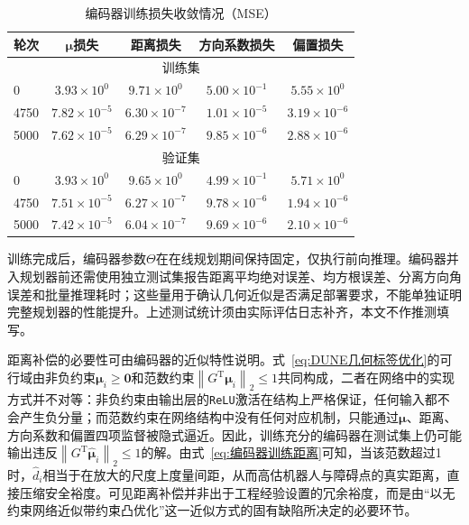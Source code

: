 \begin{table}[!htb]
	\centering
	\small
	\caption{编码器训练损失收敛情况（MSE）}
	\label{tab:距离编码器训练损失}
	\begin{tabular}{lcccc}
		\toprule
		轮次 & $\boldsymbol\mu$损失 & 距离损失 & 方向系数损失 & 偏置损失 \\
		\midrule
		\multicolumn{5}{c}{训练集} \\
		\midrule
		0 & $3.93\times10^{0}$ & $9.71\times10^{0}$ & $5.00\times10^{-1}$ & $5.55\times10^{0}$ \\
		4750 & $7.82\times10^{-5}$ & $6.30\times10^{-7}$ & $1.01\times10^{-5}$ & $3.19\times10^{-6}$ \\
		5000 & $7.62\times10^{-5}$ & $6.29\times10^{-7}$ & $9.85\times10^{-6}$ & $2.88\times10^{-6}$ \\
		\midrule
		\multicolumn{5}{c}{验证集} \\
		\midrule
		0 & $3.93\times10^{0}$ & $9.65\times10^{0}$ & $4.99\times10^{-1}$ & $5.71\times10^{0}$ \\
		4750 & $7.51\times10^{-5}$ & $6.27\times10^{-7}$ & $9.78\times10^{-6}$ & $1.94\times10^{-6}$ \\
		5000 & $7.42\times10^{-5}$ & $6.04\times10^{-7}$ & $9.69\times10^{-6}$ & $2.10\times10^{-6}$ \\
		\bottomrule
	\end{tabular}
\end{table}

训练完成后，编码器参数$\Theta$在在线规划期间保持固定，仅执行前向推理。编码器并入规划器前还需使用独立测试集报告距离平均绝对误差、均方根误差、分离方向角误差和批量推理耗时；这些量用于确认几何近似是否满足部署要求，不能单独证明完整规划器的性能提升。上述测试统计须由实际评估日志补齐，本文不作推测填写。

距离补偿的必要性可由编码器的近似特性说明。式~\eqref{eq:DUNE几何标签优化}的可行域由非负约束$\boldsymbol\mu_i\geq\mathbf0$和范数约束$\left\|G^{\mathrm T}\boldsymbol\mu_i\right\|_2\leq1$共同构成，二者在网络中的实现方式并不对等：非负约束由输出层的\texttt{ReLU}激活在结构上严格保证，任何输入都不会产生负分量；而范数约束在网络结构中没有任何对应机制，只能通过$\boldsymbol\mu$、距离、方向系数和偏置四项监督被隐式逼近。因此，训练充分的编码器在测试集上仍可能输出违反$\left\|G^{\mathrm T}\hat{\boldsymbol\mu}_i\right\|_2\leq1$的解。由式~\eqref{eq:编码器训练距离}可知，当该范数超过1时，$\hat d_i$相当于在放大的尺度上度量间距，从而高估机器人与障碍点的真实距离，直接压缩安全裕度。可见距离补偿并非出于工程经验设置的冗余裕度，而是由“以无约束网络近似带约束凸优化”这一近似方式的固有缺陷所决定的必要环节。

